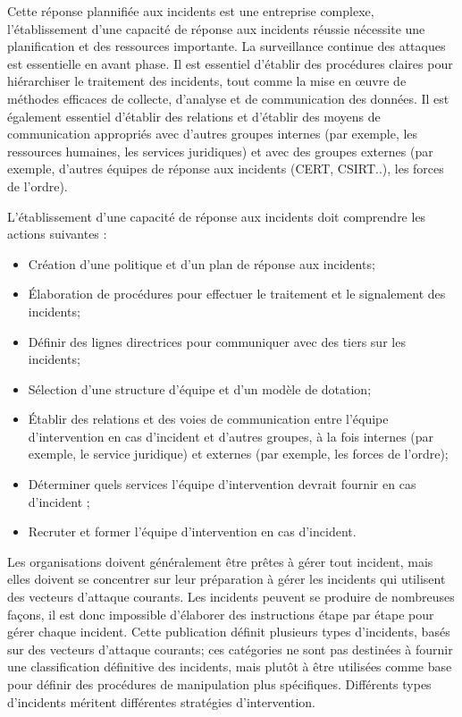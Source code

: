 Cette réponse plannifiée aux incidents est une entreprise complexe, l'établissement d'une capacité de réponse aux incidents réussie nécessite une planification et des ressources importante. La surveillance continue des attaques est essentielle en avant phase. Il est essentiel d'établir des procédures claires pour hiérarchiser le traitement des incidents, tout comme la mise en œuvre de méthodes efficaces de collecte, d'analyse et de communication des données. Il est également essentiel d'établir des relations et d'établir des moyens de communication appropriés avec d'autres groupes internes (par exemple, les ressources humaines, les services juridiques) et avec des groupes externes (par exemple, d'autres équipes de réponse aux incidents (CERT, CSIRT..), les forces de l'ordre).

L'établissement d'une capacité de réponse aux incidents doit comprendre les actions suivantes :

\begin{itemize}
  \item Création d'une politique et d'un plan de réponse aux incidents;
  \item  Élaboration de procédures pour effectuer le traitement et le signalement des incidents;
  \item Définir des lignes directrices pour communiquer avec des tiers sur les incidents;
   \item Sélection d'une structure d'équipe et d'un modèle de dotation;
  \item  Établir des relations et des voies de communication entre l'équipe d'intervention en cas d'incident et d'autres groupes, à la fois internes (par exemple, le service juridique) et externes (par exemple, les forces de l'ordre);
  \item Déterminer quels services l'équipe d'intervention devrait fournir en cas d'incident ;
  \item Recruter et former l'équipe d'intervention en cas d'incident.
\end{itemize}


Les organisations doivent généralement être prêtes à gérer tout incident, mais elles doivent se concentrer sur leur préparation à gérer les incidents qui utilisent des vecteurs d'attaque courants.
Les incidents peuvent se produire de nombreuses façons, il est donc impossible d'élaborer des instructions étape par étape pour gérer chaque incident. Cette publication définit plusieurs types d'incidents, basés sur des vecteurs d'attaque courants; ces catégories ne sont pas destinées à fournir une classification définitive des incidents, mais plutôt à être utilisées comme base pour définir des procédures de manipulation plus spécifiques. Différents types d'incidents méritent différentes stratégies d'intervention. 

